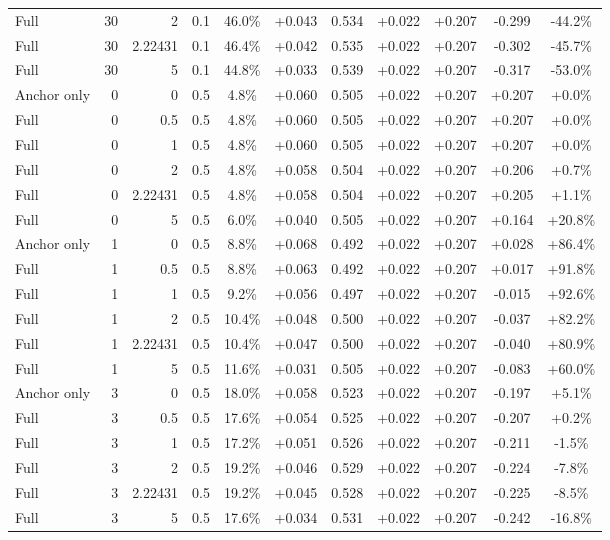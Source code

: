 \begin{table}[htbp]
\begin{tabular}{lrrrccccccc}
Full & 30 & 2 & 0.1 & 46.0\% & +0.043 & 0.534 & +0.022 & +0.207 & -0.299 & -44.2\% \\
Full & 30 & 2.22431 & 0.1 & 46.4\% & +0.042 & 0.535 & +0.022 & +0.207 & -0.302 & -45.7\% \\
Full & 30 & 5 & 0.1 & 44.8\% & +0.033 & 0.539 & +0.022 & +0.207 & -0.317 & -53.0\% \\
Anchor only & 0 & 0 & 0.5 & 4.8\% & +0.060 & 0.505 & +0.022 & +0.207 & +0.207 & +0.0\% \\
Full & 0 & 0.5 & 0.5 & 4.8\% & +0.060 & 0.505 & +0.022 & +0.207 & +0.207 & +0.0\% \\
Full & 0 & 1 & 0.5 & 4.8\% & +0.060 & 0.505 & +0.022 & +0.207 & +0.207 & +0.0\% \\
Full & 0 & 2 & 0.5 & 4.8\% & +0.058 & 0.504 & +0.022 & +0.207 & +0.206 & +0.7\% \\
Full & 0 & 2.22431 & 0.5 & 4.8\% & +0.058 & 0.504 & +0.022 & +0.207 & +0.205 & +1.1\% \\
Full & 0 & 5 & 0.5 & 6.0\% & +0.040 & 0.505 & +0.022 & +0.207 & +0.164 & +20.8\% \\
Anchor only & 1 & 0 & 0.5 & 8.8\% & +0.068 & 0.492 & +0.022 & +0.207 & +0.028 & +86.4\% \\
Full & 1 & 0.5 & 0.5 & 8.8\% & +0.063 & 0.492 & +0.022 & +0.207 & +0.017 & +91.8\% \\
Full & 1 & 1 & 0.5 & 9.2\% & +0.056 & 0.497 & +0.022 & +0.207 & -0.015 & +92.6\% \\
Full & 1 & 2 & 0.5 & 10.4\% & +0.048 & 0.500 & +0.022 & +0.207 & -0.037 & +82.2\% \\
Full & 1 & 2.22431 & 0.5 & 10.4\% & +0.047 & 0.500 & +0.022 & +0.207 & -0.040 & +80.9\% \\
Full & 1 & 5 & 0.5 & 11.6\% & +0.031 & 0.505 & +0.022 & +0.207 & -0.083 & +60.0\% \\
Anchor only & 3 & 0 & 0.5 & 18.0\% & +0.058 & 0.523 & +0.022 & +0.207 & -0.197 & +5.1\% \\
Full & 3 & 0.5 & 0.5 & 17.6\% & +0.054 & 0.525 & +0.022 & +0.207 & -0.207 & +0.2\% \\
Full & 3 & 1 & 0.5 & 17.2\% & +0.051 & 0.526 & +0.022 & +0.207 & -0.211 & -1.5\% \\
Full & 3 & 2 & 0.5 & 19.2\% & +0.046 & 0.529 & +0.022 & +0.207 & -0.224 & -7.8\% \\
Full & 3 & 2.22431 & 0.5 & 19.2\% & +0.045 & 0.528 & +0.022 & +0.207 & -0.225 & -8.5\% \\
Full & 3 & 5 & 0.5 & 17.6\% & +0.034 & 0.531 & +0.022 & +0.207 & -0.242 & -16.8\% \\

\end{tabular}
\end{table}
